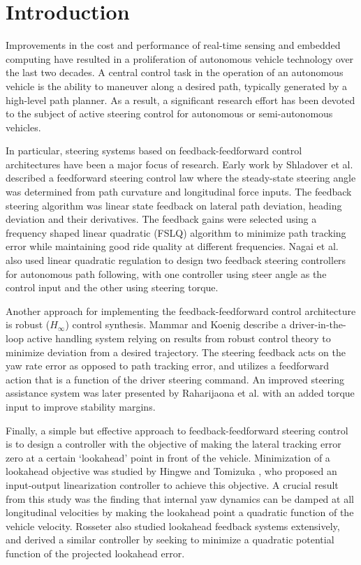 \documentclass{nVSD2e}
\theoremstyle{plain}
\theoremstyle{definition}
\theoremstyle{remark}
\begin{document}
\section{Introduction}
\label{sec:intro}

Improvements in the cost and performance of real-time sensing and embedded computing have resulted in a proliferation
of autonomous vehicle technology over the last two decades. A central control task in the operation of an autonomous vehicle is the ability
to maneuver along a desired path, typically generated by a high-level path planner. As a result, a significant research effort has been devoted to the subject of active steering control for autonomous or semi-autonomous vehicles.

In particular, steering systems based on feedback-feedforward control architectures have been a major focus of research.
Early work by Shladover et al. \cite{shladover} described a feedforward steering control law where the steady-state
steering angle was determined from path curvature and longitudinal force inputs. The feedback steering algorithm was linear state feedback on lateral path deviation, heading deviation and their
derivatives. The feedback gains were selected using a frequency shaped linear quadratic (FSLQ) algorithm to minimize
 path tracking error while maintaining good ride quality at different frequencies. Nagai et al. \cite{nagai} also used linear quadratic 
regulation to design two feedback steering controllers for autonomous path following, with one controller using steer angle as the control input
and the other using steering torque. 

Another approach for implementing the feedback-feedforward control architecture is robust ($H_\infty$) control synthesis.
Mammar and Koenig \cite{mammar} describe a driver-in-the-loop active handling system relying on results from robust
 control theory to minimize deviation from a desired trajectory. The steering feedback acts on the yaw rate error as opposed to path tracking error, and utilizes a feedforward action that is a function of the
 driver steering command. An improved steering assistance system was later presented by Raharijaona et al. \cite{raharijaona} 
 with an added torque input to improve stability margins. 

Finally, a simple but effective approach to feedback-feedforward steering control is to design a controller with the objective of
making the lateral tracking error zero at a certain `lookahead' point in front of the vehicle. Minimization of a lookahead
objective was studied by Hingwe and Tomizuka \cite{hingwe}, who proposed an input-output linearization controller to achieve this objective.
A crucial result from this study was the finding that internal yaw dynamics can be damped at all longitudinal velocities by making the
lookahead point a quadratic function of the vehicle velocity. Rosseter \cite{rosseter} also studied lookahead feedback systems extensively,
and derived a similar controller by seeking to minimize a quadratic potential function of the projected lookahead error. 
\end{document}
